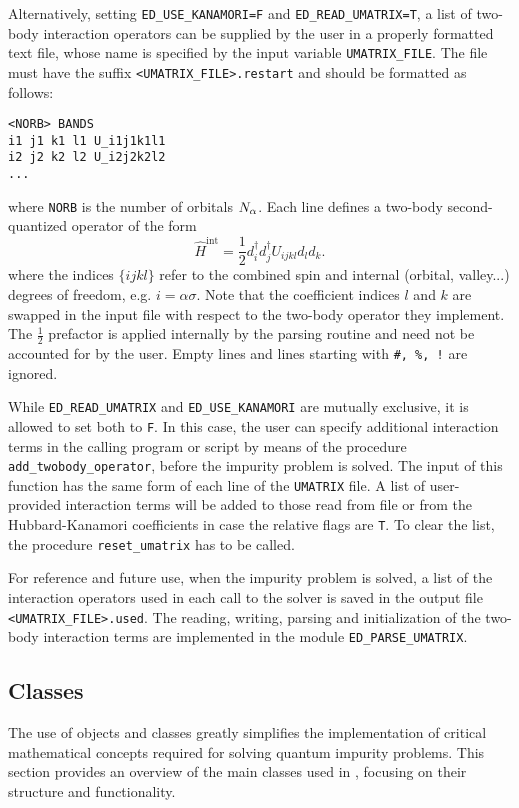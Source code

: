 \documentclass[edipack_sp.tex]{subfiles}
\begin{document}
Alternatively, setting {\tt ED\_USE\_KANAMORI=F} and {\tt ED\_READ\_UMATRIX=T}, a list of two-body interaction operators can be supplied by the user in a properly
formatted text file, whose name is specified by the input variable {\tt UMATRIX\_FILE}.  
The file must have the suffix {\tt <UMATRIX\_FILE>.re\-star\-t} and should be formatted as follows: 
\begin{lstlisting}[style=mybash,numbers=none]
<NORB> BANDS
i1 j1 k1 l1 U_i1j1k1l1
i2 j2 k2 l2 U_i2j2k2l2
...
\end{lstlisting}
where {\tt NORB} is the number of orbitals $N_\alpha$.
Each line defines a two-body second-quantized operator of the form 
$$
\hat{H}^{\mathrm{int}}=\frac{1}{2}d^{\dagger}_{i}d^{\dagger}_{j}U_{ijkl}d_{l}d_{k}.
$$
where the indices $\{ijkl\}$ refer to the combined spin and internal (orbital, valley...) degrees of freedom, e.g. $i=\alpha\sigma$. 
Note that the coefficient indices $l$ and $k$ are swapped in the input file with respect to the two-body operator they implement. The $\tfrac{1}{2}$ prefactor is applied internally by the parsing routine and need not be accounted for by the user.
Empty lines and lines starting with {\tt \#, \%, !} are ignored.

While {\tt ED\_READ\_UMATRIX} and {\tt ED\_USE\_KANAMORI}
are mutually exclusive, it is allowed to set both to {\tt F}. 
In this case, the user can specify additional interaction terms in the calling program or script by means of the procedure {\tt add\_twobody\_operator}, before the impurity problem is solved. The input of this function has the same form of each line of the {\tt UMATRIX} file. 
A list of user-provided interaction terms will be added to those read from file or from the Hubbard-Kanamori coefficients in case the relative flags are {\tt T}. To clear the list, the procedure {\tt reset\_umatrix} has to be called.

For reference and future use, when the impurity problem is solved, a list of the interaction operators used in each call to the solver is saved in the output file 
{\tt <UMATRIX\_FILE>.used}.
The reading, writing, parsing and initialization of the two-body interaction terms are implemented in the module {\tt ED\_PARSE\_UMATRIX}.
















\subsection{Classes}
The use of objects and classes greatly simplifies the implementation of critical mathematical concepts required for solving quantum 
impurity problems. This section provides an overview of the main 
classes used in \NAME, focusing on their structure and functionality.
\end{document}
